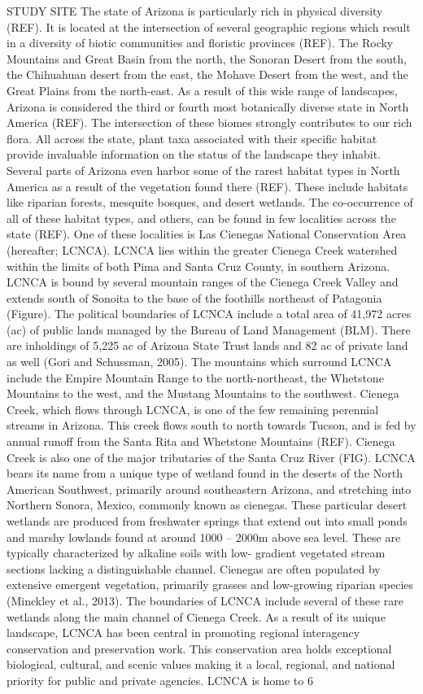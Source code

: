 \documentclass{article}
\begin{document}
STUDY SITE
The state of Arizona is particularly rich in physical diversity (REF). It is located at the intersection of several geographic regions which result in a diversity of biotic communities and floristic provinces (REF). The Rocky Mountains and Great Basin from the north, the Sonoran Desert from the south, the Chihuahuan desert from the east, the Mohave Desert from the west, and the Great Plains from the north-east. As a result of this wide range of landscapes, Arizona is considered the third or fourth most botanically diverse state in North America (REF). The intersection of these biomes strongly contributes to our rich flora. All across the state, plant taxa associated with their specific habitat provide invaluable information on the status of the landscape they inhabit. Several parts of Arizona even harbor some of the rarest habitat types in North America as a result of the vegetation found there (REF). These include habitats like riparian forests, mesquite bosques, and desert wetlands. The co-occurrence of all of these habitat types, and others, can be found in few localities across the state (REF). One of these localities is Las Cienegas National Conservation Area (hereafter; LCNCA). LCNCA lies within the greater Cienega Creek watershed within the limits of both Pima and Santa Cruz County, in southern Arizona. LCNCA is bound by several mountain ranges of the Cienega Creek Valley and extends south of Sonoita to the base of the foothills northeast of Patagonia (Figure). The political boundaries of LCNCA include a total area of 41,972 acres (ac) of public lands managed by the Bureau of Land Management (BLM). There are inholdings of 5,225 ac of Arizona State Trust lands and 82 ac of private land as well (Gori and Schussman, 2005). The mountains which surround LCNCA include the Empire Mountain Range to the north-northeast, the Whetstone Mountains to the west, and the Mustang Mountains to the southwest. Cienega Creek, which flows through LCNCA, is one of the few remaining perennial streams in Arizona. This creek flows south to north towards Tucson, and is fed by annual runoff from the Santa Rita and Whetstone Mountains (REF). Cienega Creek is also one of the major tributaries of the Santa Cruz River (FIG). LCNCA bears its name from a unique type of wetland found in the deserts of the North American Southwest, primarily around southeastern Arizona, and stretching into Northern Sonora, Mexico, commonly known as cienegas. These particular desert wetlands are produced from freshwater springs that extend out into small ponds and marshy lowlands found at around 1000 – 2000m above sea level. These are typically characterized by alkaline soils with low- gradient vegetated stream sections lacking a distinguishable channel. Cienegas are often populated by extensive emergent vegetation, primarily grasses and low-growing riparian species (Minckley et al., 2013).  The boundaries of LCNCA include several of these rare wetlands along the main channel of Cienega Creek. As a result of its unique landscape, LCNCA has been central in promoting regional interagency conservation and preservation work. This conservation area holds exceptional biological, cultural, and scenic values making it a local, regional, and national priority for public and private agencies. LCNCA is home to 6 
\end{document}
